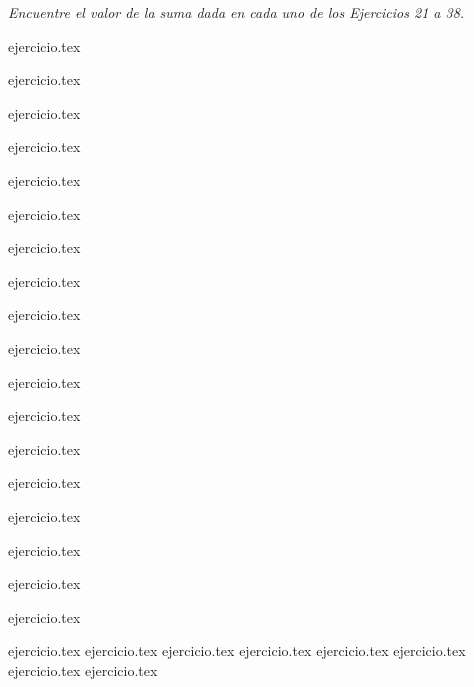 \vspace{1em}
\noindent \textit{Encuentre el valor de la suma dada en cada uno de los Ejercicios 21 a 38.}

\begin{enumerate}
    \setcounter{enumi}{20}
    \begin{minipage}{0.3\textwidth}
    {ejercicio.tex}
    \addtocounter{enumi}{2}
    {ejercicio.tex}
    \addtocounter{enumi}{2}
    {ejercicio.tex}
    \addtocounter{enumi}{1}
    {ejercicio.tex}
    \addtocounter{enumi}{1}
    {ejercicio.tex}
    \end{minipage}%
    \begin{minipage}{0.3\textwidth}
    \setcounter{enumi}{21}
    {ejercicio.tex}
    \addtocounter{enumi}{2}
    {ejercicio.tex}
    \addtocounter{enumi}{2}
    {ejercicio.tex}
    \addtocounter{enumi}{1}
    {ejercicio.tex}
    \addtocounter{enumi}{1}
    {ejercicio.tex}
    \end{minipage}%
    \begin{minipage}{0.3\textwidth}
    \setcounter{enumi}{22}
    {ejercicio.tex}
    \addtocounter{enumi}{2}
    {ejercicio.tex}
    \end{minipage}
\end{enumerate}

\begin{enumerate}
    \setcounter{enumi}{32}
    \begin{minipage}{0.45\textwidth}
    {ejercicio.tex}
    \addtocounter{enumi}{1}
    {ejercicio.tex}
    \addtocounter{enumi}{1}
    {ejercicio.tex}
    \end{minipage}%
    \begin{minipage}{0.45\textwidth}
    \setcounter{enumi}{33}
    {ejercicio.tex}
    \addtocounter{enumi}{1}
    {ejercicio.tex}
    \addtocounter{enumi}{1}
    {ejercicio.tex}
    \end{minipage}
\end{enumerate}

\vspace{1em}
\begin{enumerate}
    \setcounter{enumi}{38}
    {ejercicio.tex}
    {ejercicio.tex}
    {ejercicio.tex}
    {ejercicio.tex}
    {ejercicio.tex}
    {ejercicio.tex}
    {ejercicio.tex}
    {ejercicio.tex}
\end{enumerate}


